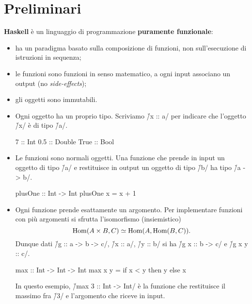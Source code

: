 \section{Preliminari}

\begin{frame}[fragile]
\textbf{Haskell} è un linguaggio di programmazione \textbf{puramente funzionale}:
\begin{itemize}[<+(1)->]
\item ha un paradigma basato sulla composizione di funzioni, non sull'esecuzione di istruzioni in sequenza;
\item le funzioni sono funzioni in senso matematico, a ogni input associano un output (no \emph{side-effects});
\item gli oggetti sono immutabili.
\end{itemize}
\end{frame}

\begin{frame}[fragile]
\begin{itemize}
\item Ogni oggetto ha un proprio tipo. Scriviamo \h/x :: a/ per indicare che l'oggetto \h/x/ è di tipo \h/a/.

\pause

\begin{haskellcode}
7 :: Int
0.5 :: Double
True :: Bool
\end{haskellcode}

\item<3-> Le funzioni sono normali oggetti. Una funzione che prende in input un oggetto di tipo \h/a/ e restituisce in output un oggetto di tipo \h/b/ ha tipo \h/a -> b/.

\pause\pause

\begin{haskellcode}
plusOne :: Int -> Int
plusOne x = x + 1
\end{haskellcode}

\end{itemize}
\end{frame}

\begin{frame}[fragile]
\begin{itemize}
\item Ogni funzione prende esattamente un argomento. Per implementare funzioni con più argomenti si sfrutta l'isomorfismo (insiemistico)
\[
\operatorname{Hom}(A\times B,C)\simeq\operatorname{Hom}(A,\operatorname{Hom}(B,C)).
\]
\pause
Dunque dati \h/g :: a -> b -> c/, \h/x :: a/, \h/y :: b/ si ha \h/g x :: b -> c/ e \h/g x y :: c/.

\pause
\begin{haskellcode}
max :: Int -> Int -> Int
max x y = if x < y then y else x
\end{haskellcode}

\pause
In questo esempio, \h/max 3 :: Int -> Int/ è la funzione che restituisce il massimo fra \h/3/ e l'argomento che riceve in input.
\end{itemize}
\end{frame}

